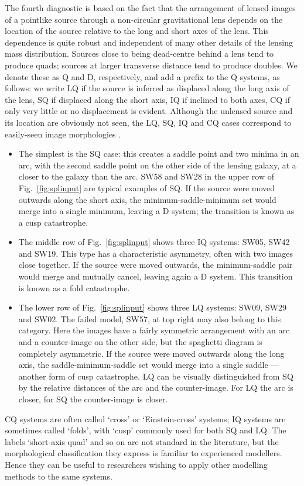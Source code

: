 The fourth diagnostic is based on the fact that the arrangement of
lensed images of a pointlike source through a non-circular
gravitational lens depends on the location of the source relative to
the long and short axes of the lens.  This dependence is quite robust
and independent of many other details of the lensing mass
distribution.  Sources close to being dead-centre behind a lens tend
to produce quads; sources at larger transverse distance tend to
produce doubles.  We denote these as Q and D, respectively, and add a
prefix to the Q systems, as follows: we write LQ if the source is
inferred as displaced along the long axis of the lens, SQ if displaced
along the short axis, IQ if inclined to both axes, CQ if only very little or
no displacement is evident.  Although the
unlensed source and its location are obviously not seen, the LQ, SQ, IQ and CQ
cases correspond to easily-seen image morphologies \citep[see,
  e.g.,][]{2003AJ....125.2769S}.
\begin{itemize}
\item The simplest is the SQ case: this creates a saddle point and two
  minima in an arc, with the second saddle point on the other side of
  the lensing galaxy, at a closer to the galaxy than the arc.  SW58
  and SW28 in the upper row of Fig.~\ref{fig:splinput} are typical
  examples of SQ.  If the source were moved outwards along the short
  axis, the minimum-saddle-minimum set would merge into a single minimum,
  leaving a D system; the transition is known as a cusp catastrophe.
\item The middle row of Fig.~\ref{fig:splinput} shows three IQ
  systems: SW05, SW42 and SW19.  This type has a characteristic
  asymmetry, often with two images close together.  If the source
  were moved outwards, the minimum-saddle pair would merge and
  mutually cancel, leaving again a D system. This transition is known
  as a fold catastrophe.
\item The lower row of Fig.~\ref{fig:splinput} shows three LQ
  systems: SW09, SW29 and SW02. The failed model, SW57, at top right
  may also belong to this category.  Here the images have a
  fairly symmetric arrangement with an arc and a counter-image on the
  other side, but the spaghetti diagram is completely asymmetric.  If
  the source were moved outwards along the long axis, the
  saddle-minimum-saddle set  would merge into a single saddle --- another
  form of cusp catastrophe.  LQ can be visually distinguished from SQ
  by the relative distances of the arc and the counter-image.  For
  LQ the arc is closer, for SQ the counter-image is closer.
\end{itemize}
CQ systems are often called `cross' or `Einstein-cross' systems; IQ
systems are sometimes called `folds', with `cusp' commonly used for
both SQ and LQ.  The labels `short-axis quad' and so on are not
standard in the literature, but the morphological classification they
express is familiar to experienced modellers.  Hence they can be
useful to researchers wishing to apply other modelling methods to the
same systems.

